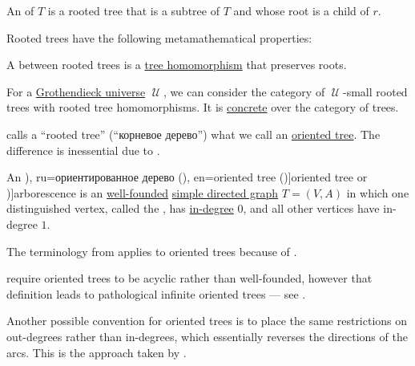 \begin{definition}
\begin{thmenum}
    \mimprovised An  of \( T \) is a rooted tree that is a subtree of \( T \) and whose root is a child of \( r \).
  \end{thmenum}

  Rooted trees have the following metamathematical properties:
  \begin{thmenum}[resume=def:rooted_tree]
    \mimprovised A  between rooted trees is a \hyperref[def:tree/homomorphism]{tree homomorphism} that preserves roots.

    \mimprovised For a \hyperref[def:grothendieck_universe]{Grothendieck universe} \( \mscrU \), we can consider the category of \( \mscrU \)-small rooted trees with rooted tree homomorphisms. It is \hyperref[def:concrete_category]{concrete} over the category of trees.
  \end{thmenum}
\end{definition}
\begin{comments}
  \item {} calls a \enquote{rooted tree} (\enquote{корневое дерево}) what we call an \hyperref[def:oriented_tree]{oriented tree}. The difference is inessential due to .
\end{comments}

\begin{definition}\label{def:oriented_tree}\mimprovised
  An \term[bg=ориентирано дърво (\cite[21]{Мирчев2001Графи}), ru=ориентированное дерево (\cite[def. 5.6]{БелоусовТкачёв2004ДискретнаяМатематика}), en=oriented tree (\cite[373]{Knuth1997ArtVol1})]{oriented tree} or \term[en=arborescence (\cite[\S 3.1]{GondranMinoux1984Graphs})]{arborescence} is an \hyperref[def:well_founded_graph]{well-founded} \hyperref[def:directed_graph]{simple directed graph} \( T = (V, A) \) in which one distinguished vertex, called the , has \hyperref[def:graph_cardinality/directed_degree]{in-degree} \( 0 \), and all other vertices have in-degree \( 1 \).
\end{definition}
\begin{comments}
  \item The terminology from  applies to oriented trees because of .

  \item {} require oriented trees to be acyclic rather than well-founded, however that definition leads to pathological infinite oriented trees --- see .

  \item Another possible convention for oriented trees is to place the same restrictions on out-degrees rather than in-degrees, which essentially reverses the directions of the arcs. This is the approach taken by .
\end{comments}

